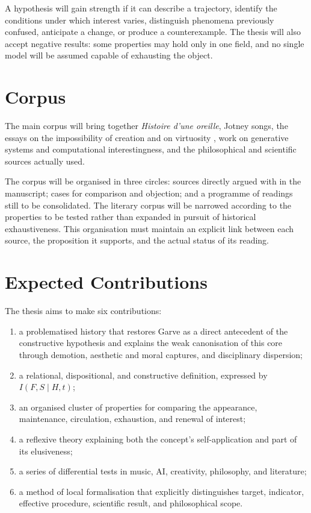 \documentclass[11pt,a4paper]{article}
\begin{document}
A hypothesis will gain strength if it can describe a trajectory, identify the
conditions under which interest varies, distinguish phenomena previously
confused, anticipate a change, or produce a counterexample. The thesis will also
accept negative results: some properties may hold only in one field, and no
single model will be assumed capable of exhausting the object.

\section{Corpus}

The main corpus will bring together \emph{Histoire d'une oreille}, Jotney songs,
the essays on the impossibility of creation and on virtuosity
\parencite{pachet2018oreille,pachet2026impossibilite,pachet2027virtuosite}, work
on generative systems and computational interestingness, and the philosophical
and scientific sources actually used.

The corpus will be organised in three circles: sources directly argued with in
the manuscript; cases for comparison and objection; and a programme of readings
still to be consolidated. The literary corpus will be narrowed according to the
properties to be tested rather than expanded in pursuit of historical
exhaustiveness. This organisation must maintain an explicit link between each
source, the proposition it supports, and the actual status of its reading.

\section{Expected Contributions}

The thesis aims to make six contributions:

\begin{enumerate}
  \item a problematised history that restores Garve as a direct antecedent of
        the constructive hypothesis and explains the weak canonisation of this
        core through demotion, aesthetic and moral captures, and disciplinary
        dispersion;
  \item a relational, dispositional, and constructive definition, expressed by
        \(I(F,S\mid H,t)\);
  \item an organised cluster of properties for comparing the appearance,
        maintenance, circulation, exhaustion, and renewal of interest;
  \item a reflexive theory explaining both the concept's self-application and
        part of its elusiveness;
  \item a series of differential tests in music, AI, creativity, philosophy,
        and literature;
  \item a method of local formalisation that explicitly distinguishes target,
        indicator, effective procedure, scientific result, and philosophical
        scope.
\end{enumerate}
\end{document}
